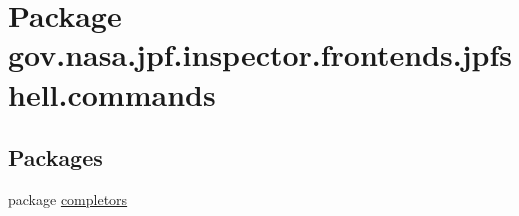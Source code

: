 \hypertarget{namespacegov_1_1nasa_1_1jpf_1_1inspector_1_1frontends_1_1jpfshell_1_1commands}{}\section{Package gov.\+nasa.\+jpf.\+inspector.\+frontends.\+jpfshell.\+commands}
\label{namespacegov_1_1nasa_1_1jpf_1_1inspector_1_1frontends_1_1jpfshell_1_1commands}
\subsection*{Packages}
\begin{DoxyCompactItemize}
\item 
package \hyperlink{namespacegov_1_1nasa_1_1jpf_1_1inspector_1_1frontends_1_1jpfshell_1_1commands_1_1completors}{completors}
\end{DoxyCompactItemize}

